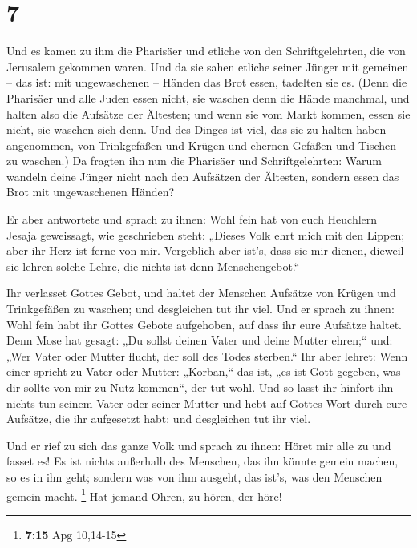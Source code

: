 \hypertarget{section-6}{%
\section{7}\label{section-6}}

 Und es kamen zu ihm die Pharisäer und etliche von den
Schriftgelehrten, die von Jerusalem gekommen waren.  Und
da sie sahen etliche seiner Jünger mit gemeinen -- das ist: mit
ungewaschenen -- Händen das Brot essen, tadelten sie es. 
(Denn die Pharisäer und alle Juden essen nicht, sie waschen denn die
Hände manchmal, und halten also die Aufsätze der Ältesten;
 und wenn sie vom Markt kommen, essen sie nicht, sie
waschen sich denn. Und des Dinges ist viel, das sie zu halten haben
angenommen, von Trinkgefäßen und Krügen und ehernen Gefäßen und Tischen
zu waschen.)  Da fragten ihn nun die Pharisäer und
Schriftgelehrten: Warum wandeln deine Jünger nicht nach den Aufsätzen
der Ältesten, sondern essen das Brot mit ungewaschenen Händen?

 Er aber antwortete und sprach zu ihnen: Wohl fein hat von
euch Heuchlern Jesaja geweissagt, wie geschrieben steht: „Dieses Volk
ehrt mich mit den Lippen; aber ihr Herz ist ferne von mir.
 Vergeblich aber ist's, dass sie mir dienen, dieweil sie
lehren solche Lehre, die nichts ist denn Menschengebot.``

 Ihr verlasset Gottes Gebot, und haltet der Menschen
Aufsätze von Krügen und Trinkgefäßen zu waschen; und desgleichen tut ihr
viel.  Und er sprach zu ihnen: Wohl fein habt ihr Gottes
Gebote aufgehoben, auf dass ihr eure Aufsätze haltet. 
Denn Mose hat gesagt: „Du sollst deinen Vater und deine Mutter ehren;``
und: „Wer Vater oder Mutter flucht, der soll des Todes sterben.``
 Ihr aber lehret: Wenn einer spricht zu Vater oder
Mutter: „Korban,`` das ist, „es ist Gott gegeben, was dir sollte von mir
zu Nutz kommen``, der tut wohl.  Und so lasst ihr hinfort
ihn nichts tun seinem Vater oder seiner Mutter  und hebt
auf Gottes Wort durch eure Aufsätze, die ihr aufgesetzt habt; und
desgleichen tut ihr viel.

 Und er rief zu sich das ganze Volk und sprach zu ihnen:
Höret mir alle zu und fasset es!  Es ist nichts außerhalb
des Menschen, das ihn könnte gemein machen, so es in ihn geht; sondern
was von ihm ausgeht, das ist's, was den Menschen gemein macht.
\footnote{\textbf{7:15} Apg 10,14-15}  Hat jemand Ohren,
zu hören, der höre!

